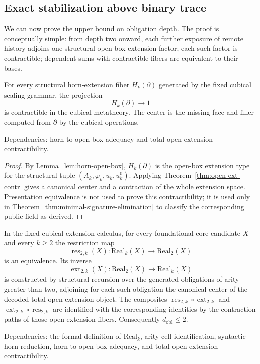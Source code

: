 \documentclass{lmcs}
\newcommand{\res}{\operatorname{res}}
\newcommand{\ext}{\operatorname{ext}}
\begin{document}
\subsection{Exact stabilization above binary trace}
\label{subsec:exact-stabilization}

We can now prove the upper bound on obligation depth.  The proof is conceptually simple:
from depth two onward, each further exposure of remote history adjoins one structural
open-box extension factor; each such factor is contractible; dependent sums with
contractible fibers are equivalent to their bases.

\begin{lem}
\label{lem:kan-contraction-horn-fibers}
For every structural horn-extension fiber \(H_k(\partial)\) generated by the fixed cubical
sealing grammar, the projection
\[
  H_k(\partial) \to 1
\]
is contractible in the cubical metatheory.  The center is the missing face and filler computed
from \(\partial\) by the cubical operations.

Dependencies: horn-to-open-box adequacy and total open-extension contractibility.
\end{lem}

\begin{proof}
By Lemma~\ref{lem:horn-open-box}, \(H_k(\partial)\) is the open-box extension type for the
structural tuple \((A_k,\varphi_k,u_k,u^0_k)\).  Applying
Theorem~\ref{thm:open-ext-contr} gives a canonical center and a contraction of the whole
extension space.  Presentation equivalence is not used to prove this contractibility; it is
used only in Theorem~\ref{thm:minimal-signature-elimination} to classify the corresponding
public field as derived.
\end{proof}

\begin{thm}
\label{thm:exact-stabilization}
In the fixed cubical extension calculus, for every foundational-core candidate \(X\) and
every \(k\geq 2\) the restriction map
\[
  \res_{2,k}(X):\mathrm{Real}_k(X)\longrightarrow\mathrm{Real}_2(X)
\]
is an equivalence.  Its inverse
\[
  \ext_{2,k}(X):\mathrm{Real}_2(X)\longrightarrow\mathrm{Real}_k(X)
\]
is constructed by structural recursion over the generated obligations of arity
greater than two, adjoining for each such obligation the canonical center of
the decoded total open-extension object.  The composites
\(\res_{2,k}\circ\ext_{2,k}\) and \(\ext_{2,k}\circ\res_{2,k}\) are identified
with the corresponding identities by the contraction paths of those
open-extension fibers.
Consequently \(d_{\mathrm{obl}}\leq 2\).

Dependencies: the formal definition of \(\mathrm{Real}_k\), arity-cell identification,
syntactic horn reduction, horn-to-open-box adequacy, and total open-extension
contractibility.
\end{thm}
\end{document}
